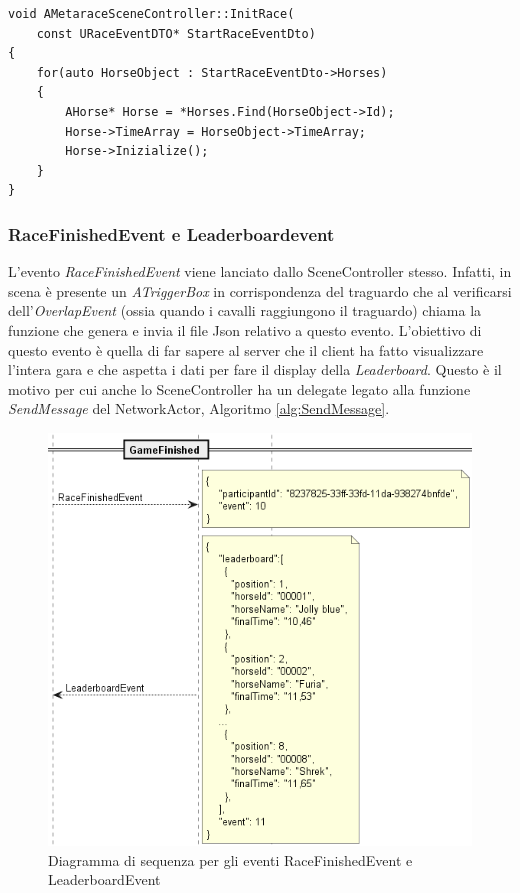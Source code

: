         \begin{lstlisting}[caption = Funzione dello SceneController che inizializza i cavalli]
void AMetaraceSceneController::InitRace(
    const URaceEventDTO* StartRaceEventDto)
{
	for(auto HorseObject : StartRaceEventDto->Horses)
	{
		AHorse* Horse = *Horses.Find(HorseObject->Id);
		Horse->TimeArray = HorseObject->TimeArray;
		Horse->Inizialize();
	}
}
        \end{lstlisting}

        \subsubsection{RaceFinishedEvent e Leaderboardevent}

        L'evento \textit{RaceFinishedEvent} viene lanciato dallo SceneController stesso.
        Infatti, in scena è presente un \textit{ATriggerBox} in corrispondenza del traguardo che al verificarsi dell'\textit{OverlapEvent} (ossia quando i cavalli raggiungono il traguardo) chiama la funzione che genera e invia il file Json relativo a questo evento.
        L'obiettivo di questo evento è quella di far sapere al server che il client ha fatto visualizzare l'intera gara e che aspetta i dati per fare il display della \textit{Leaderboard}.
        Questo è il motivo per cui anche lo SceneController ha un delegate legato alla funzione \textit{SendMessage} del NetworkActor, Algoritmo \ref{alg:SendMessage}.

        \begin{figure}[t]
            \centering
            \includegraphics[width=12cm]{figure/RaceFinishedEvent.png}
            \caption{Diagramma di sequenza per gli eventi RaceFinishedEvent e LeaderboardEvent}
        \end{figure}